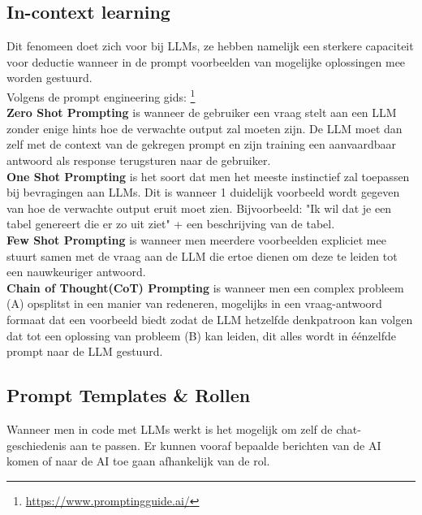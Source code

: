 \subsection{In-context learning}
\label{ssec:incontextlearning}
Dit fenomeen doet zich voor bij LLMs, ze hebben namelijk een sterkere capaciteit voor deductie wanneer in de prompt voorbeelden van mogelijke oplossingen mee worden gestuurd. \\

Volgens de prompt engineering gids: \footnote{\href{https://www.promptingguide.ai/}{https://www.promptingguide.ai/}} \\

\textbf{Zero Shot Prompting} is wanneer de gebruiker een vraag stelt aan een LLM zonder enige hints hoe de verwachte output zal moeten zijn. De LLM moet dan zelf met de context van de gekregen prompt en zijn training een aanvaardbaar antwoord als response terugsturen naar de gebruiker. \\

\textbf{One Shot Prompting} is het soort dat men het meeste instinctief zal toepassen bij bevragingen aan LLMs. Dit is wanneer 1 duidelijk voorbeeld wordt gegeven van hoe de verwachte output eruit moet zien. Bijvoorbeeld: "Ik wil dat je een tabel genereert die er zo uit ziet" + een beschrijving van de tabel. \\

\textbf{Few Shot Prompting} is wanneer men meerdere voorbeelden expliciet mee stuurt samen met de vraag aan de LLM die ertoe dienen om deze te leiden tot een nauwkeuriger antwoord. \\

\textbf{Chain of Thought(CoT) Prompting} is wanneer men een complex probleem (A) opsplitst in een manier van redeneren, mogelijks in een vraag-antwoord formaat dat een voorbeeld biedt zodat de LLM hetzelfde denkpatroon kan volgen dat tot een oplossing van probleem (B) kan leiden, dit alles wordt in éénzelfde prompt naar de LLM gestuurd.

\subsection{Prompt Templates \& Rollen}
\label{ssec:prompttemplatesandrollen}
Wanneer men in code met LLMs werkt is het mogelijk om zelf de chat-geschiedenis aan te passen. Er kunnen vooraf bepaalde berichten van de AI komen of naar de AI toe gaan afhankelijk van de rol. \\

